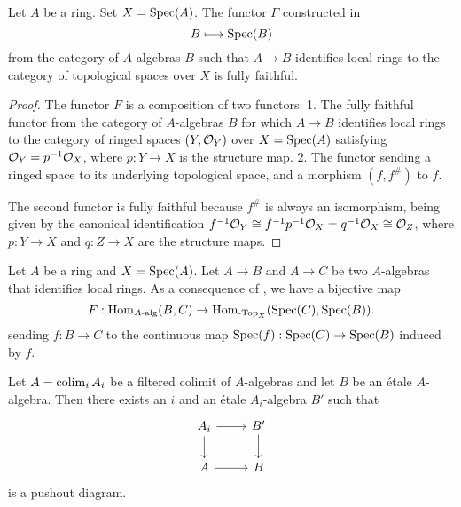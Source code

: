 \begin{lemma}{\cite[\href{https://stacks.math.columbia.edu/tag/096L}{Tag 096L}]{stacks-project}}
  \label{thm:identifies-local-ring-to-top-fully-faithful}
  Let $A$ be a ring. Set $X = \operatorname{Spec} (A)$. The functor \(F\) constructed in 
  \[
  B \longmapsto \operatorname{Spec} (B)
  \]
  from the category of $A$-algebras $B$ such that $A \to B$ identifies local rings to the category of topological spaces over $X$ is fully faithful.
\end{lemma}

\begin{proof}
The functor \(F\) is a composition of two functors:
1. The fully faithful functor from the category of \(A\)-algebras \(B\) for which \(A \to B\) identifies local rings to the category of ringed spaces \((Y, {\mathcal{O}}_Y)\) over \(X = \operatorname{Spec}(A)\) satisfying \({\mathcal{O}}_Y = p^{-1}{\mathcal{O}}_X\), where \(p: Y \to X\) is the structure map.
2. The functor sending a ringed space to its underlying topological space, and a morphism \((f, f^\#)\) to \(f\).

The second functor is fully faithful because \(f^\#\) is always an isomorphism, being given by the canonical identification \(f^{-1}{\mathcal{O}}_Y \cong f^{-1}p^{-1}{\mathcal{O}}_X = q^{-1}{\mathcal{O}}_X \cong {\mathcal{O}}_Z\), where \(p: Y \to X\) and \(q: Z \to X\) are the structure maps.
\end{proof}

\begin{definition}
  \label{def:identifies-local-ring-hom-set-bijection}
  Let \(A\) be a ring and \(X = \operatorname{Spec}(A)\). Let \(A \to B\) and \(A \to C\) be two \(A\)-algebras that identifies local rings. As a consequence of , we have a bijective map 
  \[F : \operatorname{Hom}_{A\textnormal{-alg}}(B, C) \to \operatorname{Hom}_{\textnormal{-Top}_X}(\operatorname{Spec}(C), \operatorname{Spec}(B)).\]
  sending \(f : B \to C\) to the continuous map \(\operatorname{Spec}(f) : \operatorname{Spec}(C) \to \operatorname{Spec}(B)\) induced by \(f\).
\end{definition}

\begin{lemma}
    Let $A = \operatorname{colim}_i A_i$ be a filtered colimit of $A$-algebras and let $B$ be an étale $A$-algebra. Then
    there exists an $i$ and an étale $A_i$-algebra $B'$ such that
    \[
    \begin{tikzcd}
        A_i \arrow{r} \arrow{d} & B' \arrow{d} \\
        A \arrow{r} & B
    \end{tikzcd}
    \] is a pushout diagram.
    \label{lemma:etale-ind-spreads}
\end{lemma}

